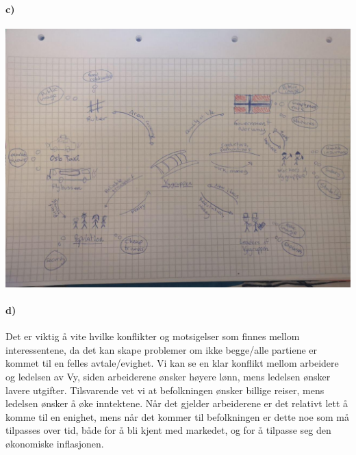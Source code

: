 \documentclass{../../myassignment}
\begin{document}
	\paragraph*{c)}
	\begin{answer}
		\includegraphics[scale=0.4]{vygruppenrelationships.jpg}

	\end{answer}

	\paragraph*{d)}
	\begin{answer}
		Det er viktig å vite hvilke konflikter og motsigelser som finnes mellom interessentene, da det kan skape problemer om ikke begge/alle partiene er kommet til en felles avtale/evighet. Vi kan se en klar konflikt mellom arbeidere og ledelsen av Vy, siden arbeiderene ønsker høyere lønn, mens ledelsen ønsker lavere utgifter. Tilsvarende vet vi at befolkningen ønsker billige reiser, mens ledelsen ønsker å øke inntektene. Når det gjelder arbeiderene er det relativt lett å komme til en enighet, mens når det kommer til befolkningen er dette noe som må tilpasses over tid, både for å bli kjent med markedet, og for å tilpasse seg den økonomiske inflasjonen. 


	\end{answer}
\end{document}
